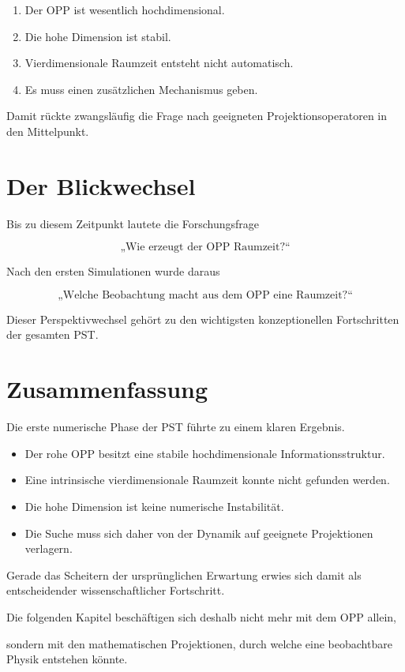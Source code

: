 \begin{enumerate}

\item
Der OPP ist wesentlich hochdimensional.

\item
Die hohe Dimension ist stabil.

\item
Vierdimensionale Raumzeit entsteht nicht automatisch.

\item
Es muss einen zusätzlichen Mechanismus geben.

\end{enumerate}

Damit rückte zwangsläufig die Frage nach geeigneten Projektionsoperatoren in den Mittelpunkt.


\section*{Der Blickwechsel}

Bis zu diesem Zeitpunkt lautete die Forschungsfrage

\[
\text{„Wie erzeugt der OPP Raumzeit?“}
\]

Nach den ersten Simulationen wurde daraus

\[
\boxed{
\text{„Welche Beobachtung macht aus dem OPP eine Raumzeit?“}
}
\]

Dieser Perspektivwechsel gehört zu den wichtigsten konzeptionellen Fortschritten der gesamten PST.


\section*{Zusammenfassung}

Die erste numerische Phase der PST führte zu einem klaren Ergebnis.

\begin{itemize}

\item
Der rohe OPP besitzt eine stabile hochdimensionale Informationsstruktur.

\item
Eine intrinsische vierdimensionale Raumzeit konnte nicht gefunden werden.

\item
Die hohe Dimension ist keine numerische Instabilität.

\item
Die Suche muss sich daher von der Dynamik auf geeignete Projektionen verlagern.

\end{itemize}

Gerade das Scheitern der ursprünglichen Erwartung erwies sich damit als entscheidender wissenschaftlicher Fortschritt.

Die folgenden Kapitel beschäftigen sich deshalb nicht mehr mit dem OPP allein,

sondern mit den mathematischen Projektionen, durch welche eine beobachtbare Physik entstehen könnte.


